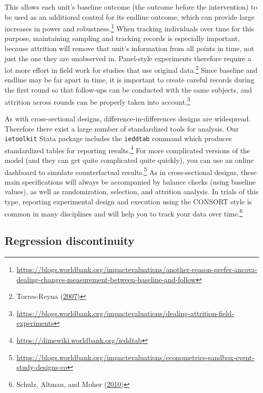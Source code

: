 \documentclass[
]{book}
\begin{document}
This allows each unit's baseline outcome (the outcome before the intervention) to be used
as an additional control for its endline outcome,
which can provide large increases in power and robustness.\footnote{\url{https://blogs.worldbank.org/impactevaluations/another-reason-prefer-ancova-dealing-changes-measurement-between-baseline-and-follow}}
When tracking individuals over time for this purpose,
maintaining sampling and tracking records is especially important,
because attrition will remove that unit's information
from all points in time, not just the one they are unobserved in.
Panel-style experiments therefore require a lot more effort in field work
for studies that use original data.\footnote{Torres-Reyna (\protect\hyperlink{ref-torres2007}{2007})}
Since baseline and endline may be far apart in time,
it is important to create careful records during the first round
so that follow-ups can be conducted with the same subjects,
and attrition across rounds can be properly taken into account.\footnote{\url{https://blogs.worldbank.org/impactevaluations/dealing-attrition-field-experiments}}

As with cross-sectional designs, difference-in-differences designs are widespread.
Therefore there exist a large number of standardized tools for analysis.
Our \texttt{ietoolkit} Stata package includes the \texttt{ieddtab} command
which produces standardized tables for reporting results.\footnote{\url{https://dimewiki.worldbank.org/ieddtab}}
For more complicated versions of the model
(and they can get quite complicated quite quickly),
you can use an online dashboard to simulate counterfactual results.\footnote{\url{https://blogs.worldbank.org/impactevaluations/econometrics-sandbox-event-study-designs-co}}
As in cross-sectional designs, these main specifications
will always be accompanied by balance checks (using baseline values),
as well as randomization, selection, and attrition analysis.
In trials of this type, reporting experimental design and execution
using the CONSORT style is common in many disciplines
and will help you to track your data over time.\footnote{Schulz, Altman, and Moher (\protect\hyperlink{ref-schulz2010consort}{2010})}

\hypertarget{regression-discontinuity}{%
\subsection*{Regression discontinuity}\label{regression-discontinuity}}
\end{document}
